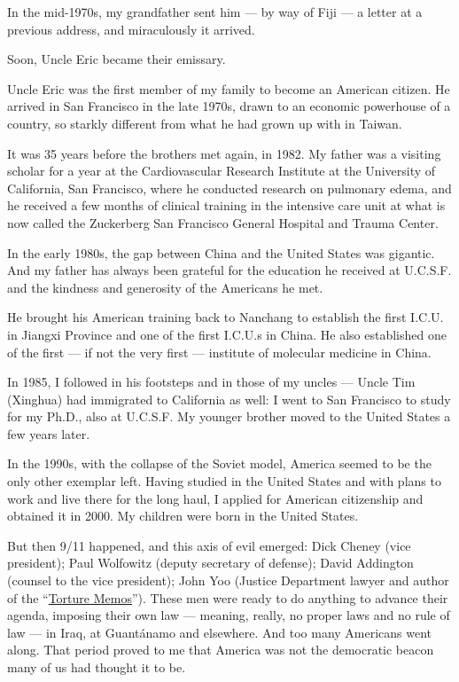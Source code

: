 In the mid-1970s, my grandfather sent him --- by way of Fiji --- a
letter at a previous address, and miraculously it arrived.

Soon, Uncle Eric became their emissary.

Uncle Eric was the first member of my family to become an American
citizen. He arrived in San Francisco in the late 1970s, drawn to an
economic powerhouse of a country, so starkly different from what he had
grown up with in Taiwan.

It was 35 years before the brothers met again, in 1982. My father was a
visiting scholar for a year at the Cardiovascular Research Institute at
the University of California, San Francisco, where he conducted research
on pulmonary edema, and he received a few months of clinical training in
the intensive care unit at what is now called the Zuckerberg San
Francisco General Hospital and Trauma Center.

In the early 1980s, the gap between China and the United States was
gigantic. And my father has always been grateful for the education he
received at U.C.S.F. and the kindness and generosity of the Americans he
met.

He brought his American training back to Nanchang to establish the first
I.C.U. in Jiangxi Province and one of the first I.C.U.s in China. He
also established one of the first --- if not the very first ---
institute of molecular medicine in China.

In 1985, I followed in his footsteps and in those of my uncles --- Uncle
Tim (Xinghua) had immigrated to California as well: I went to San
Francisco to study for my Ph.D., also at U.C.S.F. My younger brother
moved to the United States a few years later.

In the 1990s, with the collapse of the Soviet model, America seemed to
be the only other exemplar left. Having studied in the United States and
with plans to work and live there for the long haul, I applied for
American citizenship and obtained it in 2000. My children were born in
the United States.

But then 9/11 happened, and this axis of evil emerged: Dick Cheney (vice
president); Paul Wolfowitz (deputy secretary of defense); David
Addington (counsel to the vice president); John Yoo (Justice Department
lawyer and author of the
``\href{https://archive.nytimes3xbfgragh.onion/www.nytimes3xbfgragh.onion/ref/international/24MEMO-GUIDE.html?}{Torture
Memos}''). These men were ready to do anything to advance their agenda,
imposing their own law --- meaning, really, no proper laws and no rule
of law --- in Iraq, at Guantánamo and elsewhere. And too many Americans
went along. That period proved to me that America was not the democratic
beacon many of us had thought it to be.

